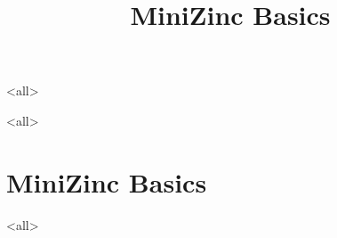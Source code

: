 \title[MiniZinc Basics] %
{MiniZinc Basics}

\subtitle
{} %



\mode<all>{

}
\clearpage
\mode<all>{
\part{MiniZinc Basics}
}
\begin{frame}
\partpage
\end{frame}
\mode<all>{

}


